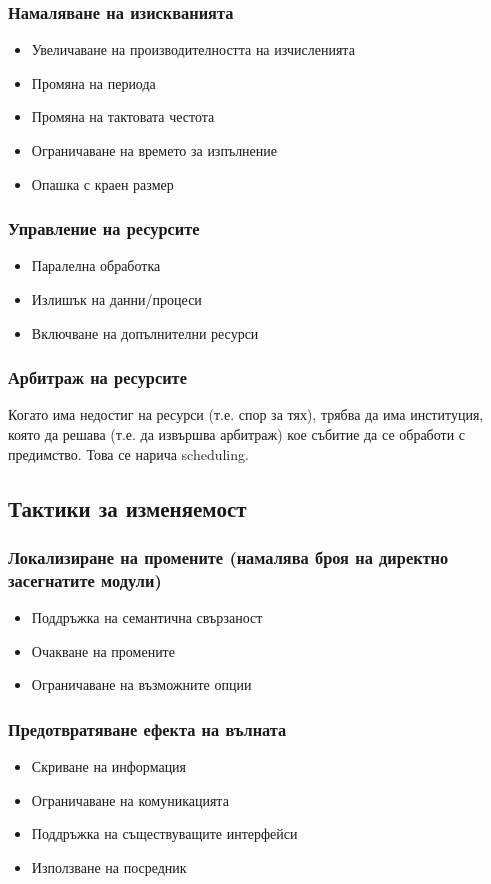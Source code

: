 \documentclass[fleqn,12pt]{article}
\begin{document}
\subsubsection{Намаляване на изискванията}
\begin{itemize}
\item Увеличаване на производителността на изчисленията
\item Промяна на периода
\item Промяна на тактовата честота
\item Ограничаване на времето за изпълнение
\item Опашка с краен размер
\end{itemize}
\subsubsection{Управление на ресурсите}
\begin{itemize}
\item Паралелна обработка
\item Излишък на данни/процеси
\item Включване на допълнителни ресурси
\end{itemize}
\subsubsection{Арбитраж на ресурсите}
Когато има недостиг на ресурси (т.е. спор за тях), трябва да има институция, която да решава (т.е. да извършва арбитраж) кое събитие да се обработи с предимство. Това се нарича scheduling. 

\subsection{Тактики за изменяемост}
\subsubsection{Локализиране на промените (намалява броя на директно
засегнатите модули)}
\begin{itemize}
\item Поддръжка на семантична свързаност
\item Очакване на промените
\item Ограничаване на възможните опции
\end{itemize}

\subsubsection{Предотвратяване ефекта на вълната}
\begin{itemize}
\item Скриване на информация
\item Ограничаване на комуникацията
\item Поддръжка на съществуващите интерфейси
\item Използване на посредник
\end{itemize}
\end{document}
